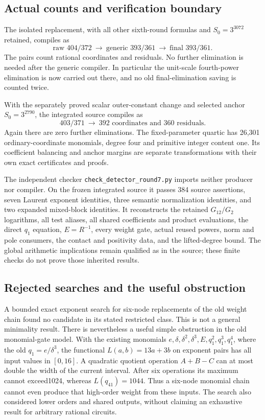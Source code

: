 \subsection{Actual counts and verification boundary}

The isolated replacement, with all other sixth-round formulas and
$S_0=3^{3072}$ retained, compiles as
\[
 \text{raw }404/372\ \longrightarrow\
 \text{generic }393/361\ \longrightarrow\
 \boxed{\text{final }393/361}.
\]
The pairs count rational coordinates and residuals. No further
elimination is needed after the generic compiler. In particular the
unit-scale fourth-power elimination is now carried out there, and no
old final-elimination saving is counted twice.

With the separately proved scalar outer-constant change and selected
anchor $S_0=3^{2790}$, the integrated source compiles as
\[
 403/371\ \longrightarrow\
 \boxed{392\text{ coordinates and }360\text{ residuals}}.
\]
Again there are zero further eliminations. The fixed-parameter quartic
has 26,301 ordinary-coordinate monomials, degree four and primitive
integer content one. Its coefficient balancing and anchor margins are
separate transformations with their own exact certificates and proofs.

The independent checker \texttt{check\_detector\_round7.py} imports
neither producer nor compiler. On the frozen integrated source it passes
384 source assertions, seven Laurent exponent identities, three semantic
normalization identities, and two expanded mixed-block identities.
It reconstructs the retained $G_{12}/G_2$ logarithms, all test aliases,
all shared coefficients and product evaluations, the direct $q_1$
equation, $E=R^{-1}$, every weight gate, actual reused powers, norm and
pole consumers, the contact and positivity data, and the lifted-degree
bound. The global arithmetic implications remain qualified as in the
source; these finite checks do not prove those inherited results.

\subsection{Rejected searches and the useful obstruction}

A bounded exact exponent search for six-node replacements of the old
weight chain found no candidate in its stated restricted class. This is
not a general minimality result. There is nevertheless a useful simple
obstruction in the old monomial-gate model. With the existing monomials
$e,\delta,\delta^2,\delta^3,E,q_1^2,q_1^3,q_1^4$, where the old
$q_1=e/\delta^3$, the functional $L(a,b)=13a+3b$ on exponent pairs
has all input values in $[0,16]$. A quadratic quotient operation
$A+B-C$ can at most double the width of the current interval.
After six operations its maximum cannot exceed1024, whereas
$L(q_{41})=1044$. Thus a six-node monomial chain cannot even produce
that high-order weight from these inputs. The search also considered
lower orders and shared outputs, without claiming an exhaustive result
for arbitrary rational circuits.

